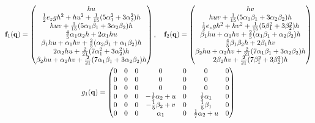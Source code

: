   \begin{gather}
    \mathbf{f}_1(\mathbf{q}) =
    \begin{pmatrix}
      h u \\
      \frac{1}{2} e_{z} g h^{2} + h u^{2} + \frac{1}{15} {(5 \alpha_{1}^{2} + 3 \alpha_{2}^{2})} h \\
      h u v + \frac{1}{15} {(5 \alpha_{1} \beta_{1} + 3 \alpha_{2} \beta_{2})} h \\
      \frac{4}{5} \alpha_{1} \alpha_{2} h + 2 \alpha_{1} h u \\
      \beta_{1} h u + \alpha_{1} h v + \frac{2}{5} {(\alpha_{2} \beta_{1} + \alpha_{1} \beta_{2})} h \\
      2 \alpha_{2} h u + \frac{2}{21} {(7 \alpha_{1}^{2} + 3 \alpha_{2}^{2})} h \\
      \beta_{2} h u + \alpha_{2} h v + \frac{2}{21} {(7 \alpha_{1} \beta_{1} + 3 \alpha_{2} \beta_{2})} h
    \end{pmatrix}, \quad
    \mathbf{f}_2(\mathbf{q}) =
    \begin{pmatrix}
      h v \\
      h u v + \frac{1}{15} {(5 \alpha_{1} \beta_{1} + 3 \alpha_{2} \beta_{2})} h \\
      \frac{1}{2} e_{z} g h^{2} + h v^{2} + \frac{1}{15} {(5 \beta_{1}^{2} + 3 \beta_{2}^{2})} h \\
      \beta_{1} h u + \alpha_{1} h v + \frac{2}{5} {(\alpha_{1} \beta_{1} + \alpha_{2} \beta_{2})} h \\
      \frac{4}{5} \beta_{1} \beta_{2} h + 2 \beta_{1} h v \\
      \beta_{2} h u + \alpha_{2} h v + \frac{2}{21} {(7 \alpha_{1} \beta_{1} + 3 \alpha_{2} \beta_{2})} h \\
      2 \beta_{2} h v + \frac{2}{21} {(7 \beta_{1}^{2} + 3 \beta_{2}^{2})} h
    \end{pmatrix} \\
    g_1(\mathbf{q}) =
    \begin{pmatrix}
      0 & 0 & 0 & 0 & 0 & 0 & 0 \\
      0 & 0 & 0 & 0 & 0 & 0 & 0 \\
      0 & 0 & 0 & 0 & 0 & 0 & 0 \\
      0 & 0 & 0 & -\frac{1}{5} \alpha_{2} + u & 0 & \frac{1}{5} \alpha_{1} & 0 \\
      0 & 0 & 0 & -\frac{1}{5} \beta_{2} + v & 0 & \frac{1}{5} \beta_{1} & 0 \\
      0 & 0 & 0 & \alpha_{1} & 0 & \frac{1}{7} \alpha_{2} + u & 0 \\

\end{pmatrix}
\end{gather}
